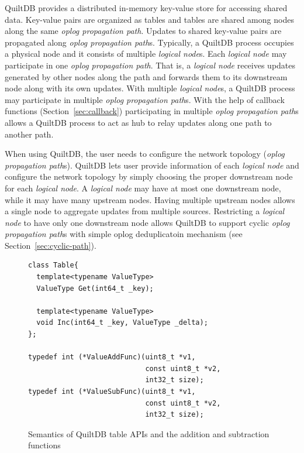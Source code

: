 \documentclass{acm_proc_article-sp}
\begin{document}
QuiltDB provides a distributed in-memory key-value store for accessing shared 
data. Key-value pairs are organized as tables and tables are shared among 
nodes along the same \emph{oplog propagation path}. Updates to shared key-value 
pairs are propagated along \emph{oplog propagation path}s. Typically, a QuiltDB 
process occupies a physical node and it
consists of multiple \emph{logical node}s. Each \emph{logical node} may 
participate in one \emph{oplog propagation path}. That is, a \emph{logical node}
receives updates generated by other nodes along the path and forwards them to 
its downstream node along with its own updates. With multiple \emph{logical 
node}s, a QuiltDB process may participate in multiple \emph{oplog propagation 
path}s. With the help of callback functions (Section~\ref{sec:callback}) 
participating in multiple \emph{oplog propagation path}s
allows a QuiltDB process to act as hub to relay updates along one path to 
another path.

When using QuiltDB, the user needs to configure the network topology 
(\emph{oplog propagation path}s). QuiltDB lets user provide information of 
each \emph{logical node} and configure the network topology by simply choosing 
the proper downstream node for each \emph{logical node}. A \emph{logical node} 
may have at most one downstream node, while it may have many upstream nodes. 
Having multiple upstream nodes allows a single node to aggregate updates from 
multiple sources. Restricting a \emph{logical node} to have only one downstream 
node allows QuiltDB to support cyclic \emph{oplog propagation path}s with simple 
oplog deduplicatoin mechanism (see Section~\ref{sec:cyclic-path}).


\begin{figure}[th!]
\begin{verbatim}
class Table{
  template<typename ValueType>
  ValueType Get(int64_t _key);

  template<typename ValueType>
  void Inc(int64_t _key, ValueType _delta);
};

typedef int (*ValueAddFunc)(uint8_t *v1,
                            const uint8_t *v2,
                            int32_t size);
typedef int (*ValueSubFunc)(uint8_t *v1,
                            const uint8_t *v2,
                            int32_t size);

\end{verbatim}
\caption{Semantics of QuiltDB table APIs and the addition and subtraction
  functions}
\label{fig:table-api}
\end{figure}
\end{document}
